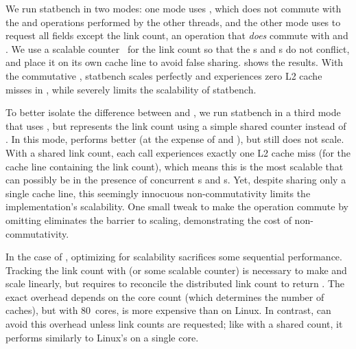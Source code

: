 %   

We run statbench in two modes: one mode uses , which does
not commute with the  and  operations performed
by the other threads, and the other mode uses  to request
all fields except the link count, an operation that \emph{does} commute
with  and .  We use a  scalable
counter~\cite{clements:radixvm} for the link count so that the
s and s do not conflict, and place it on
its own cache line to avoid false sharing.
 shows the results.  With the commutative
, statbench scales perfectly and experiences zero L2 cache
misses in , while  severely limits the
scalability of statbench.  

To better
isolate the difference between  and , we run
statbench in a
third mode that uses , but represents the link count
using a simple shared counter instead of .  In this mode, 
performs better (at the expense of  and ), but
still does not scale.  With a shared link count, each 
call experiences exactly one L2 cache miss (for the cache line
containing the link count), which means this is the most scalable that
 can possibly be in the presence of concurrent s
and s.  Yet, despite sharing only a single cache line, this
seemingly innocuous non-commutativity limits the
implementation's scalability.  One small tweak to make the operation
commute by omitting  eliminates the barrier to scaling,
demonstrating the cost of non-commutativity.

In the case of , optimizing for scalability sacrifices some
sequential performance.  Tracking the link count with 
(or some scalable counter) is necessary to make  and
 scale linearly, but requires  to reconcile the
distributed link count to return .  The exact overhead
depends on the core count (which determines the number of 
caches), but with 80~cores,  is 
more expensive than on Linux.  
In contrast,  can avoid this overhead unless link counts are
requested; like  with a shared count, it performs similarly to Linux's  on
a single core.

